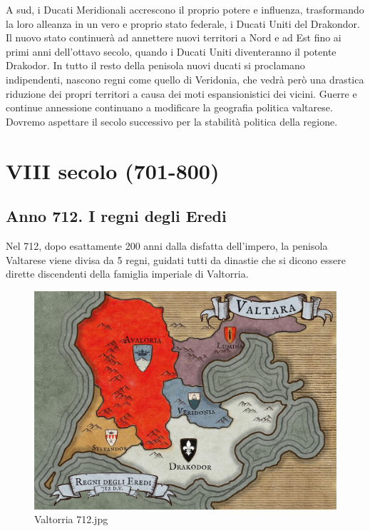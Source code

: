 A sud, i Ducati Meridionali accrescono il proprio potere e influenza,
trasformando la loro alleanza in un vero e proprio stato federale, i
Ducati Uniti del Drakondor. Il nuovo stato continuerà ad annettere nuovi
territori a Nord e ad Est fino ai primi anni dell'ottavo secolo, quando
i Ducati Uniti diventeranno il potente Drakodor. In tutto il resto della
penisola nuovi ducati si proclamano indipendenti, nascono regni come
quello di Veridonia, che vedrà però una drastica riduzione dei propri
territori a causa dei moti espansionistici dei vicini. Guerre e continue
annessione continuano a modificare la geografia politica valtarese.
Dovremo aspettare il secolo successivo per la stabilità politica della
regione.

\section{VIII secolo (701-800)}\label{viii-secolo-701-800}

\subsection{Anno 712. I regni degli
Eredi}\label{anno-712.-i-regni-degli-eredi}

Nel 712, dopo esattamente 200 anni dalla disfatta dell'impero, la
penisola Valtarese viene divisa da 5 regni, guidati tutti da dinastie
che si dicono essere dirette discendenti della famiglia imperiale di
Valtorria.

\begin{figure}
\centering
\includegraphics{Valtorria_712.jpg}
\caption{Valtorria 712.jpg}
\end{figure}

